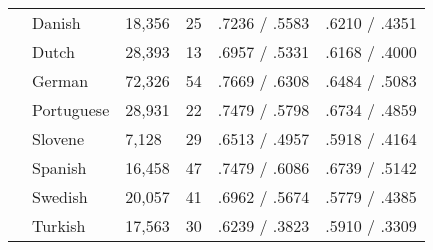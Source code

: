 \begin{table}[ht]
\begin{tabular}{|l|l|l|l|l|l|}
        & Danish     & 18,356  & 25 & .7236 / .5583 & .6210 / .4351\\
        & Dutch      & 28,393  & 13 & .6957 / .5331 & .6168 / .4000\\
        & German     & 72,326  & 54 & .7669 / .6308 & .6484 / .5083\\
        & Portuguese & 28,931  & 22 & .7479 / .5798 & .6734 / .4859\\
        & Slovene    & 7,128   & 29 & .6513 / .4957 & .5918 / .4164\\
        & Spanish    & 16,458  & 47 & .7479 / .6086 & .6739 / .5142\\
        & Swedish    & 20,057  & 41 & .6962 / .5674 & .5779 / .4385\\
        & Turkish    & 17,563  & 30 & .6239 / .3823 & .5910 / .3309\\ \hline
    \end{tabular}
  \label{tab:multiresults}
\end{table}
